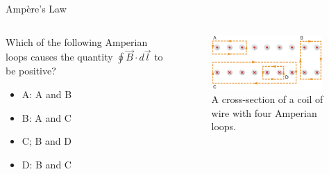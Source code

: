 \documentclass{beamer}
\begin{document}
\begin{frame}{Amp\`{e}re's Law}
\begin{columns}[T]
\begin{column}{0.5\textwidth}
\small
Which of the following Amperian loops causes the quantity $\oint \vec{B} \cdot d\vec{l}$ to be positive?
\begin{itemize}
\item A: A and B
\item B: A and C
\item C; B and D
\item D: B and C
\end{itemize}
\end{column}
\begin{column}{0.5\textwidth}
\begin{figure}
\centering
\includegraphics[width=0.95\textwidth]{figures/ampQuestion1.jpeg}
\caption{\label{fig:ampQuestion1} A cross-section of a coil of wire with four Amperian loops.}
\end{figure}
\end{column}
\end{columns}
\end{frame}
\end{document}

